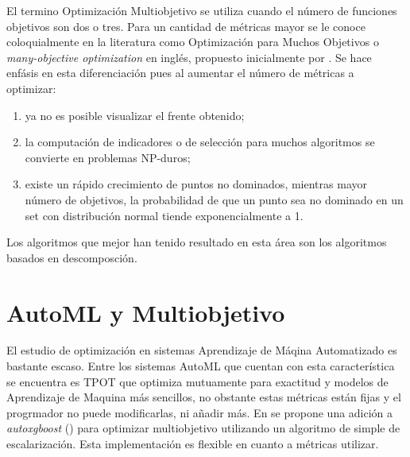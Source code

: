  El termino Optimizaci\'on Multiobjetivo se utiliza cuando el n\'umero de funciones objetivos son dos o tres. Para un cantidad de m\'etricas mayor se le conoce coloquialmente en la literatura como Optimizaci\'on para Muchos Objetivos o \textit{many-objective optimization} en ingl\'es, propuesto inicialmente por \cite{10.1007/978-3-540-31880-4_2}. Se hace enf\'asis en esta diferenciaci\'on pues al aumentar el n\'umero de m\'etricas a optimizar:
 \begin{enumerate}
     \item ya no es posible visualizar el frente obtenido;
     \item la computaci\'on de indicadores o de selecci\'on para muchos algoritmos se convierte en problemas NP-duros;
     \item existe un r\'apido crecimiento de puntos no dominados, mientras mayor n\'umero de objetivos, la probabilidad de que un punto sea no dominado en un set con distribuci\'on normal tiende exponencialmente a 1.
 \end{enumerate}

Los algoritmos que mejor han tenido resultado en esta \'area son los algoritmos basados en descomposci\'on.


\section{AutoML y Multiobjetivo}\label{proposal:mooautoml}

El estudio de optimizaci\'on en sistemas Aprendizaje de M\'aqina Automatizado es bastante escaso. Entre los sistemas AutoML que cuentan con esta caracter\'istica se encuentra es TPOT \cite{pmlr-v64-olson_tpot_2016} que optimiza mutuamente para exactitud y modelos de Aprendizaje de Maquina m\'as sencillos, no obstante estas m\'etricas est\'an fijas y el progrmador no puede modificarlas, ni a\~nadir m\'as.
En \cite{pfisterer2019multi} se propone una adici\'on a \textit{autoxgboost} (\cite{thomas2018automatic}) para optimizar multiobjetivo utilizando un algoritmo de simple de escalarizaci\'on. Esta implementaci\'on es flexible en cuanto a m\'etricas utilizar.

